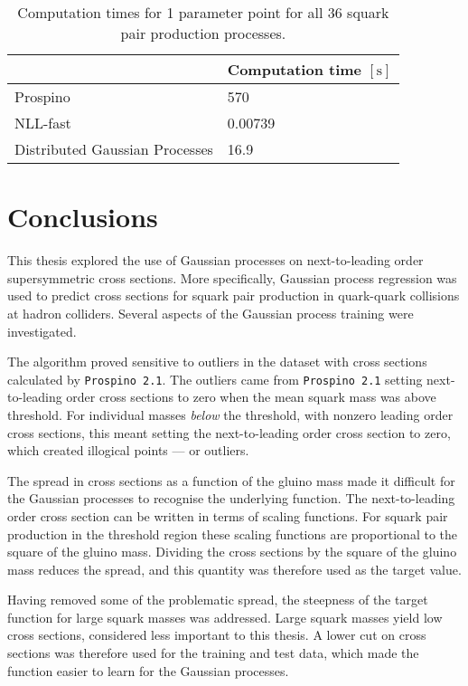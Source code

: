 \documentclass[twoside,english]{uiofysmaster}
\begin{document}
{{\begin{table}
\centering
\begin{tabular}{@{}ll@{}} \toprule
 & Computation time $[\mathrm{s}]$\\ \midrule
Prospino & 570 \\
NLL-fast & 0.00739\\
Distributed Gaussian Processes & 16.9\\
\bottomrule
\end{tabular}
\caption{Computation times for 1 parameter point for all 36 squark pair production processes.}
\label{Tab :: results : Computation times}
\end{table}

\chapter*{Conclusions}

This thesis explored the use of Gaussian processes on next-to-leading order supersymmetric cross sections. More specifically, Gaussian process regression was used to predict cross sections for squark pair production in quark-quark collisions at hadron colliders. Several aspects of the Gaussian process training were investigated. 

The algorithm proved sensitive to outliers in the dataset with cross sections calculated by \verb|Prospino 2.1|. The outliers came from \verb|Prospino 2.1| setting next-to-leading order cross sections to zero when the mean squark mass was above threshold. For individual masses \textit{below} the threshold, with nonzero leading order cross sections, this meant setting the next-to-leading order cross section to zero, which created illogical points --- or outliers. 

The spread in cross sections as a function of the gluino mass made it difficult for the Gaussian processes to recognise the underlying function. The next-to-leading order cross section can be written in terms of scaling functions. For squark pair production in the threshold region these scaling functions are proportional to the square of the gluino mass. Dividing the cross sections by the square of the gluino mass reduces the spread, and this quantity was therefore used as the target value. 

Having removed some of the problematic spread, the steepness of the target function for large squark masses was addressed. Large squark masses yield low cross sections, considered less important to this thesis. A lower cut on cross sections was therefore used for the training and test data, which made the function easier to learn for the Gaussian processes. 

}}
\end{document}
